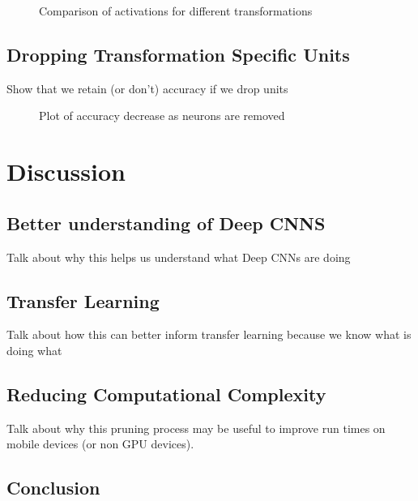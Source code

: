 \documentclass[10pt,twocolumn,letterpaper]{article}
\begin{document}
\begin{figure}
\caption{Comparison of activations for different transformations}
\label{fig:comp}
\end{figure}

\subsection{Dropping Transformation Specific Units}
Show that we retain (or don't) accuracy if we drop units

\begin{figure}
\caption{Plot of accuracy decrease as neurons are removed}
\label{fig:comp}
\end{figure}

\section{Discussion}

\subsection{Better understanding of Deep CNNS}
Talk about why this helps us understand what Deep CNNs are doing

\subsection{Transfer Learning}

Talk about how this can better inform transfer learning because we know what is doing what

\subsection{Reducing Computational Complexity}
Talk about why this pruning process may be useful to improve run times on mobile devices (or non GPU devices).

\subsection{Conclusion}



{\small


}
\end{document}
